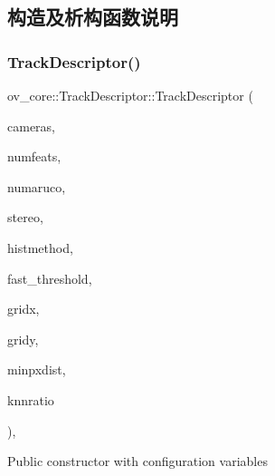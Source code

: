 \subsection{构造及析构函数说明}
\mbox{\label{classov__core_1_1TrackDescriptor_a5f7793abdb80621d2d41e619cd46b9cf}} 
\subsubsection{\texorpdfstring{Track\+Descriptor()}{TrackDescriptor()}}
{\footnotesize\ttfamily ov\+\_\+core\+::\+Track\+Descriptor\+::\+Track\+Descriptor (\begin{DoxyParamCaption}\item[{std\+::unordered\+\_\+map$<$ size\+\_\+t, std\+::shared\+\_\+ptr$<$ \hyperlink{classov__core_1_1CamBase}{Cam\+Base} $>$$>$}]{cameras,  }\item[{int}]{numfeats,  }\item[{int}]{numaruco,  }\item[{bool}]{stereo,  }\item[{\hyperlink{classov__core_1_1TrackBase_aa4b34a5dce99b59522d57bf9278c9a1a}{Histogram\+Method}}]{histmethod,  }\item[{int}]{fast\+\_\+threshold,  }\item[{int}]{gridx,  }\item[{int}]{gridy,  }\item[{int}]{minpxdist,  }\item[{double}]{knnratio }\end{DoxyParamCaption})\hspace{0.3cm}{\ttfamily [inline]}, {\ttfamily [explicit]}}



Public constructor with configuration variables 


